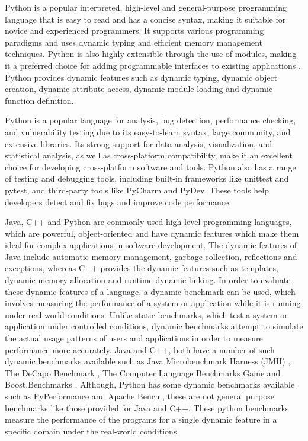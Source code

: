 Python is a popular interpreted, high-level and general-purpose programming language that is easy to read and has a concise syntax, making it suitable for novice and experienced programmers. It supports various programming paradigms and uses dynamic typing and efficient memory management techniques. Python is also highly extensible through the use of modules, making it a preferred choice for adding programmable interfaces to existing applications \cite{Python_language_wiki}. Python provides dynamic features such as dynamic typing, dynamic object creation, dynamic attribute access, dynamic module loading and dynamic function definition.

Python is a popular language for analysis, bug detection, performance checking, and vulnerability testing due to its easy-to-learn syntax, large community, and extensive libraries. Its strong support for data analysis, visualization, and statistical analysis, as well as cross-platform compatibility, make it an excellent choice for developing cross-platform software and tools. Python also has a range of testing and debugging tools, including built-in frameworks like unittest and pytest, and third-party tools like PyCharm and PyDev. These tools help developers detect and fix bugs and improve code performance.

Java, C++ and Python are commonly used high-level programming languages, which are powerful, object-oriented and have dynamic features which make them ideal for complex applications in software development. The dynamic features of Java include automatic memory management, garbage collection, reflections and exceptions, whereas C++ provides the dynamic features such as templates, dynamic memory allocation and runtime dynamic linking. In order to evaluate these dynamic features of a language, a dynamic benchmark can be used, which involves measuring the performance of a system or application while it is running under real-world conditions.  Unlike static benchmarks, which test a system or application under controlled conditions, dynamic benchmarks attempt to simulate the actual usage patterns of users and applications in order to measure performance more accurately. Java and C++, both have a number of such dynamic benchmarks available such as Java Microbenchmark Harness (JMH) \cite{JMH}, The DeCapo Benchmark \cite{DaCapo_2006}, The Computer Language Benchmarks Game \cite{C++_Benchmark1} and Boost.Benchmarks \cite{Boost_Benchmarks}. Although, Python has some dynamic benchmarks available such as PyPerformance \cite{PyPerformance} and Apache Bench \cite{Apache_Benchmark}, these are not general purpose benchmarks like those provided for Java and C++. These python benchmarks measure the performance of the programs for a single dynamic feature in a specific domain under the real-world conditions.

